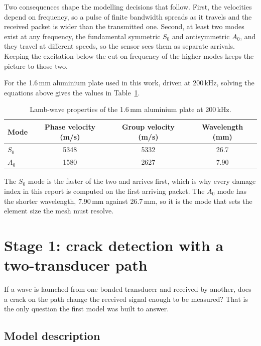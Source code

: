 Two consequences shape the modelling decisions that follow. First, the velocities depend on frequency, so a
pulse of finite bandwidth spreads as it travels and the received packet is wider than the transmitted one.
Second, at least two modes exist at any frequency, the fundamental symmetric $S_{0}$ and antisymmetric
$A_{0}$, and they travel at different speeds, so the sensor sees them as separate arrivals. Keeping the
excitation below the cut-on frequency of the higher modes keeps the picture to those two.

For the 1.6\,mm aluminium plate used in this work, driven at 200\,kHz, solving the equations above gives the
values in Table~\ref{tab:dispersion}.

\begin{table}[H]
\centering
\caption{Lamb-wave properties of the 1.6\,mm aluminium plate at 200\,kHz.}
\begin{tabular}{l c c c}
\toprule
Mode & Phase velocity (m/s) & Group velocity (m/s) & Wavelength (mm) \\
\midrule
$S_{0}$ & 5348 & 5332 & 26.7 \\
$A_{0}$ & 1580 & 2627 & 7.90 \\
\bottomrule
\end{tabular}
\label{tab:dispersion}
\end{table}

The $S_{0}$ mode is the faster of the two and arrives first, which is why every damage index in this report is
computed on the first arriving packet. The $A_{0}$ mode has the shorter wavelength, 7.90\,mm against
26.7\,mm, so it is the mode that sets the element size the mesh must resolve.

\section{Stage 1: crack detection with a two-transducer path}
\label{sec:stage1}

If a wave is launched from one bonded transducer and received by another, does a crack on the path change
the received signal enough to be measured? That is the only question the first model was built to answer.

\subsection{Model description}

